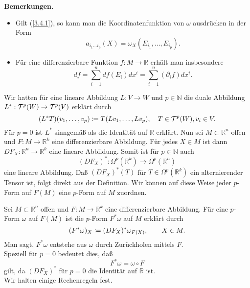 \documentclass[a4paper,twoside,DIV15,BCOR12mm]{scrbook}
\begin{document}
\noindent
{\bf Bemerkungen.} 
\begin{itemize}
\item Gilt (\ref{3.4.1}), so kann man die Koordinatenfunktion von $\omega$ ausdrücken in 
der Form
\[ a_{i_{1} \dots i_{p}}(X) = \omega_{X}(E_{i_1},\dots,E_{i_p}). \]
\item Für eine differenzierbare Funktion $f: M \to {\mathbb R}$ erhält man insbesondere
\[ df = \sum_{i=1}^{n} df(E_{i}) dx^{i} = \sum_{i=1}^{n} (\partial_{i}f) dx^{i}. \]
\end{itemize}
Wir hatten für eine lineare Abbildung $L: V \to W$ und $p \in {\mathbb N}$ die duale 
Abbildung $L^{*}: {\cal T}^{p}(W) \to {\cal T}^{p}(V)$ erklärt durch
\[ (L^{*}T)(v_{1},\dots,v_{p}) \da  T(Lv_{1},\dots,Lv_{p}), 
\quad T \in {\cal T}^{p}(W), v_{i} \in V. \]
Für $p = 0$ ist $L^{*}$ sinngemäß als die Identität auf ${\mathbb R}$ erklärt. 
Nun sei $M \subset {\mathbb R}^{n}$ offen und $F: M \to {\mathbb R}^{k}$ eine differenzierbare 
Abbildung. Für jedes $X \in M$ ist dann $DF_{X}: {\mathbb R}^{n} \to {\mathbb R}^{k}$ eine 
lineare Abbildung. Somit ist für $p \in {\mathbb N}$ auch
\[ (DF_{X})^{*}: \Omega^{p}({\mathbb R}^{k}) \to \Omega^{p}({\mathbb R}^{n}) \]
eine lineare Abbildung. Daß $(DF_{X})^{*}(T)$ für $T \in \Omega^{p}({\mathbb R}^{k})$ ein 
alternierender Tensor ist, folgt direkt aus der Definition. 
Wir können auf diese Weise jeder $p$-Form auf $F(M)$ eine $p$-Form auf $M$ zuordnen. 

\bigskip

 Sei $M \subset {\mathbb R}^{n}$ offen und 
$F: M \to {\mathbb R}^{k}$ eine differenzierbare Abbildung. 
Für eine $p$-Form $\omega$ auf $F(M)$ ist die $p$-Form $F^{*}\omega$ auf 
$M$ erklärt durch
\[ (F^{*}\omega)_{X} \da  (DF_{X})^{*}\omega_{F(X)}, \qquad X \in M. \]
Man sagt, $F^{*}\omega$ entstehe aus $\omega$ durch Zurückholen mittels $F$.\\

\noindent
Speziell für $p = 0$ bedeutet dies, daß 
\[ F^{*}\omega = \omega \circ F \]
gilt, da $(DF_{X})^{*}$ für $p=0$ die Identität auf ${\mathbb R}$ ist.\\

\noindent
Wir halten einige Rechenregeln fest.

\bigskip
\end{document}
